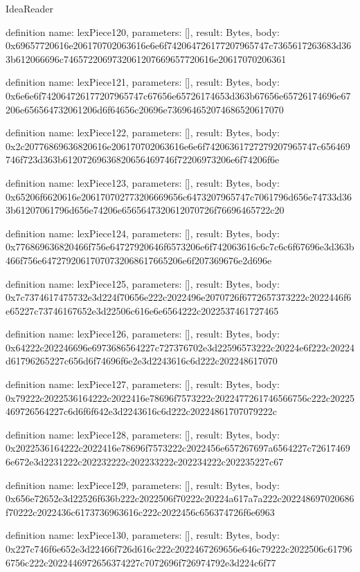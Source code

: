 \begin{lexlean}{IdeaReader}
\begin{semanticmodule}
definition{
  name: lexPiece120,
  parameters: [],
  result: Bytes,
  body: 0x69657720616e206170702063616e6e6f742064726177207965747c7365617263683d363b612066696c7465722069732061207669657720616e20617070206361
}

definition{
  name: lexPiece121,
  parameters: [],
  result: Bytes,
  body: 0x6e6e6f742064726177207965747c67656e65726174653d363b67656e65726174696e67206e656564732061206d6f64656c20696e736964652074686520617070
}

definition{
  name: lexPiece122,
  parameters: [],
  result: Bytes,
  body: 0x2c20776869636820616e206170702063616e6e6f74206361727279207965747c656469746f723d363b61207269636820656469746f72206973206e6f74206f6e
}

definition{
  name: lexPiece123,
  parameters: [],
  result: Bytes,
  body: 0x65206f6620616e206170702773206669656c6473207965747c7061796d656e74733d363b61207061796d656e74206e6565647320612070726f76696465722c20
}

definition{
  name: lexPiece124,
  parameters: [],
  result: Bytes,
  body: 0x776869636820466f756e64727920646f6573206e6f742063616c6c7c6c6f67696e3d363b466f756e64727920617070732068617665206e6f207369676e2d696e
}

definition{
  name: lexPiece125,
  parameters: [],
  result: Bytes,
  body: 0x7c7374617475732e3d224f70656e222c2022496e2070726f6772657373222c2022446f6e65227c73746167652e3d22506c616e6e6564222c2022537461727465
}

definition{
  name: lexPiece126,
  parameters: [],
  result: Bytes,
  body: 0x64222c202246696e6973686564227c727376702e3d22596573222c20224e6f222c20224d61796265227c656d6f74696f6e2e3d2243616c6d222c202248617070
}

definition{
  name: lexPiece127,
  parameters: [],
  result: Bytes,
  body: 0x79222c2022536164222c2022416e78696f7573222c2022477261746566756c222c20225469726564227c6d6f6f642e3d2243616c6d222c20224861707079222c
}

definition{
  name: lexPiece128,
  parameters: [],
  result: Bytes,
  body: 0x2022536164222c2022416e78696f7573222c2022456e657267697a6564227c726174696e672e3d2231222c202232222c202233222c202234222c202235227c67
}

definition{
  name: lexPiece129,
  parameters: [],
  result: Bytes,
  body: 0x656e72652e3d22526f636b222c2022506f70222c20224a617a7a222c202248697020686f70222c2022436c6173736963616c222c2022456c656374726f6e6963
}

definition{
  name: lexPiece130,
  parameters: [],
  result: Bytes,
  body: 0x227c746f6e652e3d22466f726d616c222c2022467269656e646c79222c2022506c617966756c222c2022446972656374227c7072696f726974792e3d224c6f77
}


\end{semanticmodule}
\end{lexlean}
